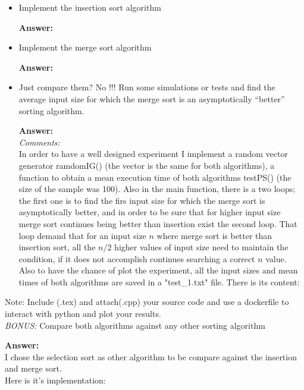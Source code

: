 \documentclass[12pt]{article}
\begin{document}
\begin{itemize}
    \item Implement the insertion sort algorithm

    \textbf{Answer: }\\
    

    \item Implement the merge sort algorithm

    \textbf{Answer: }\\
    

    \item Just compare them? No !!! Run some simulations or tests and find the average input size for which the merge sort is an asymptotically ``better'' sorting algorithm.

    \textbf{Answer: }\\
    

    \emph{Comments: }\\
    In order to have a well designed experiment I implement a random vector generator ramdomIG() (the vector is the same for both algorithms), a function to obtain a mean execution time of both algorithms testPS() (the size of the sample was 100). Also in the main function, there is a two loops; the first one is to find the firs input size for which the merge sort is asymptotically better, and in order to be sure that for higher input size merge sort continues being better than insertion exist the second loop. That loop demand that for an input size $n$ where merge sort is better than insertion sort, all the $n/2$ higher values of input size need to maintain the condition, if it does not accomplish continues searching a correct $n$ value.\\
    Also to have the chance of plot the experiment, all the input sizes and mean times of both algorithms are saved in a "test\_1.txt" file. There is its content:

    

\end{itemize}

Note: Include (.tex) and attach(.cpp) your source code and use a dockerfile to interact with python and plot your results.\\

\emph{BONUS:} Compare both algorithms against any other sorting algorithm

\textbf{Answer: }\\
I chose the selection sort as other algorithm to be compare against the insertion and merge sort.\\
Here is it's implementation:\\

\end{document}
